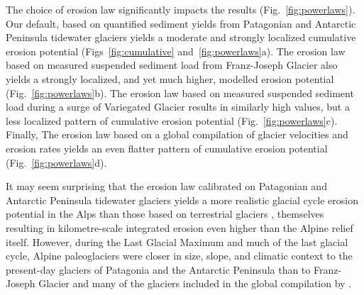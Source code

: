 \documentclass[esurf, manuscript]{copernicus}
\begin{document}
    The choice of erosion law significantly impacts the results
    (Fig.~\ref{fig:powerlaws}). Our default, based on quantified
    sediment yields from Patagonian and Antarctic Peninsula tidewater glaciers
    \citep[${\dot{e}=5.2\times10^{-8}u_\mathrm{b}^{2.34}}$,][]{Koppes.etal.2015}
    yields a moderate and strongly localized cumulative erosion potential
    (Figs~\ref{fig:cumulative} and~\ref{fig:powerlaws}a). The erosion law
    based on measured suspended sediment load from Franz-Joseph Glacier
    \citep[${\dot{e}=2.7\times10^{-7}u_\mathrm{b}^{2.02}}$,][]{Herman.etal.2015}
    also yields a strongly localized, and yet much higher, modelled erosion
    potential (Fig.~\ref{fig:powerlaws}b). The erosion law based on measured
    suspended sediment load during a surge of Variegated Glacier
    \citep[${\dot{e}=1\times10^{-4}u_\mathrm{b}^{1}}$,][]{Humphrey.Raymond.1994}
    results in similarly high values, but a less localized pattern of cumulative
    erosion potential (Fig.~\ref{fig:powerlaws}c). Finally, The erosion law
    based on a global compilation of glacier velocities and erosion rates
    \citep[${\dot{e}=1.665\times10^{-1}u_\mathrm{b}^{0.6459}}$,][]{Cook.etal.2020}
    yields an even flatter pattern of cumulative erosion potential
    (Fig.~\ref{fig:powerlaws}d).

    It may seem surprising that the erosion law calibrated on Patagonian and
    Antarctic Peninsula tidewater glaciers \citep{Koppes.etal.2015} yields a
    more realistic glacial cycle erosion potential in the Alps than those based
    on terrestrial
    glaciers \citep{Humphrey.Raymond.1994, Herman.etal.2015, Cook.etal.2020},
    themselves resulting in kilometre-scale integrated erosion even
    higher than the Alpine relief itself. However, during the Last Glacial
    Maximum and much of the last glacial cycle, Alpine paleoglaciers were
    closer in size, slope, and climatic context to the present-day glaciers of
    Patagonia and the Antarctic Peninsula \citep{Koppes.etal.2015} than to
    Franz-Joseph Glacier \citep{Herman.etal.2015} and many of the glaciers
    included in the global compilation by \citet{Cook.etal.2020}.
\end{document}
